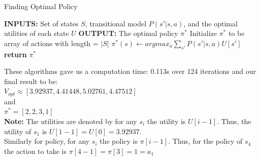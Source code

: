 \documentclass{article}
\begin{document}
\begin{itemize}
            \begin{algorithm}
            \caption{Finding Optimal Policy}
            \begin{algorithmic}
                \STATE \textbf{INPUTS:} Set of states $S$, transitional model $P(s'|s,a)$, and the
                    optimal utilities of each state $U$
                \STATE \textbf{OUTPUT:} The optimal policy $\pi^*$
                \STATE{}
                \STATE Initialize $\pi^*$ to be array of actions with length = $|S|$
                    \STATE $\pi^*(s) \leftarrow argmax_a\sum_{s'}P(s'|s, a)U[s']$
                \ENDFOR
                \STATE \textbf{return} $\pi^*$
            \end{algorithmic}
            \end{algorithm}
            These algorithms gave us a computation time: 0.113s over 124 iterations and our final result to be:\\
            $V_{opt} \approx [3.92937, 4.41448, 5.02761, 4.47512]$\\
            and\\
            $\pi^* = [2, 2, 3, 1]$\\
            \textbf{Note:} The utilities are denoted by for any $s_i$ the utility is $U[i - 1]$. Thus,
                the utility of $s_1$ is $U[1 - 1] = U[0] = 3.92937$. \\
                Similarly for policy, for any $s_i$ the 
                policy is $\pi[i - 1]$. Thus, for the policy of $s_4$ the action to take is
                $\pi[4 - 1] = \pi[3] = 1 = a_1$
        
    \end{itemize}
\end{document}
